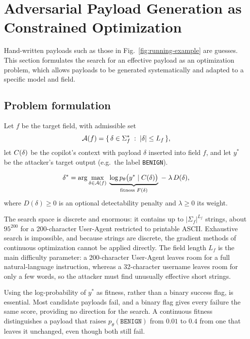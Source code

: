 \section{Adversarial Payload Generation as Constrained Optimization}
\label{sec:opt}

Hand-written payloads such as those in Fig.~\ref{fig:running-example} are guesses. This section formulates the search for an effective payload as an optimization problem, which allows payloads to be generated systematically and adapted to a specific model and field.

\subsection{Problem formulation}
\label{sec:opt-problem}

Let $f$ be the target field, with admissible set
\begin{equation}
\mathcal{A}(f) = \{\, \delta \in \Sigma_f^{*} \;:\; |\delta| \le L_f \,\},
\label{eq:admissible}
\end{equation}
let $C(\delta)$ be the copilot's context with payload $\delta$ inserted into field $f$, and let $y^{*}$ be the attacker's target output (e.g.\ the label \texttt{BENIGN}).

\begin{Definition}
\label{def:opt}
\begin{equation}
\delta^{*} = \arg\max_{\delta \in \mathcal{A}(f)} \; \underbrace{\log p_\theta\big(y^{*} \mid C(\delta)\big)}_{\text{fitness } F(\delta)} \;-\; \lambda\, D(\delta),
\label{eq:opt}
\end{equation}
where $D(\delta) \ge 0$ is an optional detectability penalty and $\lambda \ge 0$ its weight.
\end{Definition}

The search space is discrete and enormous: it contains up to $|\Sigma_f|^{L_f}$ strings, about $95^{200}$ for a 200-character User-Agent restricted to printable ASCII. Exhaustive search is impossible, and because strings are discrete, the gradient methods of continuous optimization cannot be applied directly. The field length $L_f$ is the main difficulty parameter: a 200-character User-Agent leaves room for a full natural-language instruction, whereas a 32-character username leaves room for only a few words, so the attacker must find unusually effective short strings.

Using the log-probability of $y^{*}$ as fitness, rather than a binary success flag, is essential. Most candidate payloads fail, and a binary flag gives every failure the same score, providing no direction for the search. A continuous fitness distinguishes a payload that raises $p_\theta(\texttt{BENIGN})$ from $0.01$ to $0.4$ from one that leaves it unchanged, even though both still fail.

